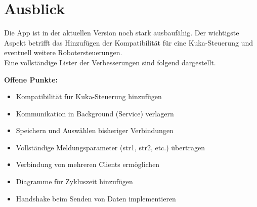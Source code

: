 \chapter{Ausblick}
Die App ist in der aktuellen Version noch stark ausbaufähig. Der wichtigste 
Aspekt betrifft das Hinzufügen der Kompatibilität für eine Kuka-Steuerung und 
eventuell weitere Robotersteuerungen.\\
Eine vollständige Lister der Verbesserungen sind folgend dargestellt.

\textbf{Offene Punkte:}
\begin{itemize}
\item Kompatibilität für Kuka-Steuerung hinzufügen
\item Kommunikation in Background (Service) verlagern
\item Speichern und Auswählen bisheriger Verbindungen
\item Vollständige Meldungsparameter (str1, str2, etc.) übertragen
\item Verbindung von mehreren Clients ermöglichen
\item Diagramme für Zykluszeit hinzufügen
\item Handshake beim Senden von Daten implementieren
\end{itemize}